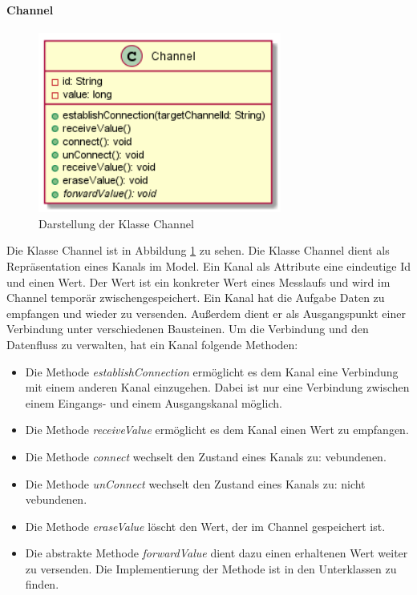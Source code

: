 \documentclass[parskip=full]{scrartcl}
\begin{document}
\paragraph{Channel}
\begin{figure}[htbp]
	\begin{center}
		\includegraphics[width = 8cm]{Grafiken/Channel.png}
		\caption{Darstellung der Klasse Channel}
		\label{Channel}
	\end{center}
\end{figure}
Die Klasse Channel ist in Abbildung \ref{Channel} zu sehen.
Die Klasse Channel dient als Repräsentation eines Kanals im Model. Ein Kanal als Attribute eine eindeutige Id und einen Wert. Der Wert ist ein konkreter Wert eines Messlaufs und wird im Channel temporär zwischengespeichert.
Ein Kanal hat die Aufgabe Daten zu empfangen und wieder zu versenden. Außerdem dient er als Ausgangspunkt einer Verbindung unter verschiedenen Bausteinen. Um die Verbindung und den Datenfluss zu verwalten, hat ein Kanal folgende Methoden:

\begin{itemize}

\item Die Methode \textit{establishConnection} ermöglicht es dem Kanal eine Verbindung mit einem anderen Kanal einzugehen. Dabei ist nur eine Verbindung zwischen einem Eingangs- und einem Ausgangskanal möglich.
\item Die Methode \textit{receiveValue} ermöglicht es dem Kanal einen Wert zu empfangen.
\item Die Methode \textit{connect} wechselt den Zustand eines Kanals zu: vebundenen.
\item Die Methode \textit{unConnect} wechselt den Zustand eines Kanals zu: nicht vebundenen.
\item Die Methode \textit{eraseValue} löscht den Wert, der im Channel gespeichert ist.
\item Die abstrakte Methode \textit{forwardValue} dient dazu einen erhaltenen Wert weiter zu versenden. Die Implementierung der Methode ist in den Unterklassen zu finden.

\end{itemize}
\end{document}

